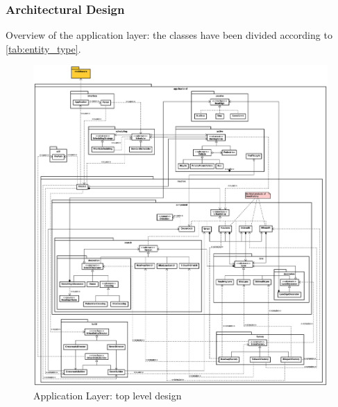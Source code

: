 \subsubsection{Architectural Design}
Overview of the application layer: the classes have been divided according to 
\ref{tab:entity_type}.
\begin{figure}[H]
  \centering
  \includegraphics[width=.95\columnwidth]{images/solution/app/backend/app_backend_architecture.eps}
  \caption{Application Layer: top level design}
  \label{fig:sd-app-backend-architecture}
\end{figure}

